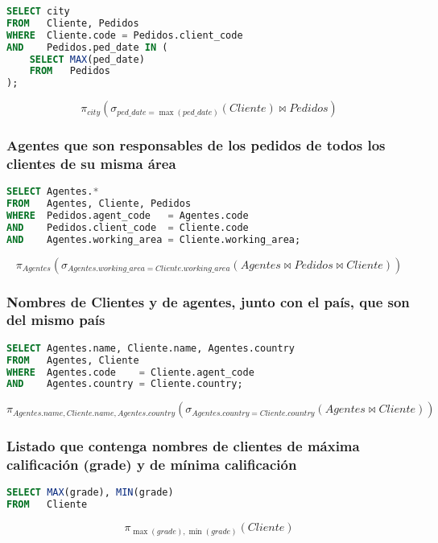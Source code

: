 \begin{lstlisting}[language=SQL]
SELECT city
FROM   Cliente, Pedidos
WHERE  Cliente.code = Pedidos.client_code
AND    Pedidos.ped_date IN (
	SELECT MAX(ped_date)
	FROM   Pedidos
);
\end{lstlisting}

\[\pi_{city}(\sigma_{ped\_date=\max(ped\_date)}(Cliente)\bowtie Pedidos)\]

\subsubsection{Agentes que son responsables de los pedidos de todos los clientes de su misma área}

\begin{lstlisting}[language=SQL]
SELECT Agentes.*
FROM   Agentes, Cliente, Pedidos
WHERE  Pedidos.agent_code   = Agentes.code
AND    Pedidos.client_code  = Cliente.code
AND    Agentes.working_area = Cliente.working_area;
\end{lstlisting}

\[\pi_{Agentes}(\sigma_{Agentes.working\_area=Cliente.working\_area}(Agentes\bowtie Pedidos\bowtie Cliente))\]

\subsubsection{Nombres de Clientes y de agentes, junto con el país, que son del mismo país}

\begin{lstlisting}[language=SQL]
SELECT Agentes.name, Cliente.name, Agentes.country
FROM   Agentes, Cliente
WHERE  Agentes.code    = Cliente.agent_code
AND    Agentes.country = Cliente.country;
\end{lstlisting}

\[\pi_{Agentes.name,Cliente.name,Agentes.country}(\sigma_{Agentes.country=Cliente.country}(Agentes\bowtie Cliente))\]

\subsubsection{Listado que contenga nombres de clientes de máxima calificación (grade) y de mínima calificación}

\begin{lstlisting}[language=SQL]
SELECT MAX(grade), MIN(grade)
FROM   Cliente
\end{lstlisting}

\[\pi_{\max(grade),\min(grade)}(Cliente)\]

